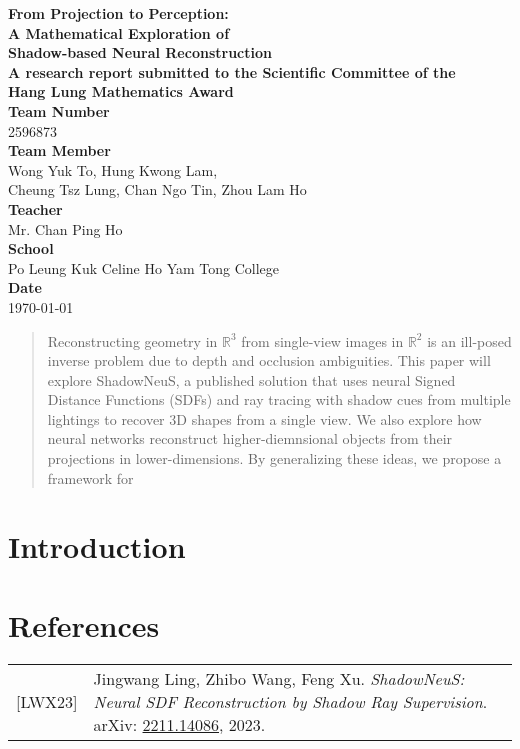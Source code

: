 \documentclass[12pt]{article}
\begin{document}
\begin{center}
    \huge \textbf{From Projection to Perception: \\ A Mathematical Exploration of \\ Shadow-based Neural Reconstruction} \\[1.5cm]
    \normalsize
    \textbf{A research report submitted to the Scientific Committee of the \\ Hang Lung Mathematics Award} \\[1.5cm]
    \textbf{Team Number} \\[0.1cm]
    2596873 \\[0.5cm]
    \textbf{Team Member} \\[0.1cm]
    Wong Yuk To, Hung Kwong Lam, \\[0.1cm]
    Cheung Tsz Lung, Chan Ngo Tin, Zhou Lam Ho \\[0.5cm]
    \textbf{Teacher} \\[0.1cm]
    Mr. Chan Ping Ho \\[0.5cm]
    \textbf{School} \\[0.1cm]
    Po Leung Kuk Celine Ho Yam Tong College\\[0.5cm]
    \textbf{Date} \\[0.1cm]
    \today \\[2 cm]
\end{center}

\begin{abstract}
    Reconstructing geometry in $\mathbb{R}^3$ from single-view images in $\mathbb{R}^2$ is an ill-posed inverse problem due to depth and occlusion ambiguities. 
    This paper will explore ShadowNeuS, a published solution that uses neural Signed Distance Functions (SDFs) and ray tracing with shadow cues from multiple lightings to recover 3D shapes from a single view. 
    We also explore how neural networks reconstruct higher-diemnsional objects from their projections in lower-dimensions. By generalizing these ideas, we propose a framework for 
\end{abstract}

\newpage
\tableofcontents

\newpage
\section{Introduction}






\section*{References}
\begin{tabular}{@{}p{} p{}}
{[LWX23]} & Jingwang Ling, Zhibo Wang, Feng Xu. \textit{ShadowNeuS: Neural SDF Reconstruction by Shadow Ray Supervision}. arXiv: \href{https://arxiv.org/abs/2211.14086}{2211.14086}, 2023.
\end{tabular}
\end{document}
